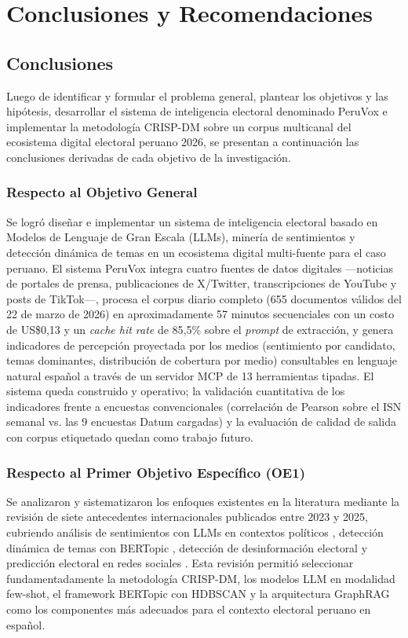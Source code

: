 \chapter{Conclusiones y Recomendaciones}
\section{Conclusiones}
Luego de identificar y formular el problema general, plantear los objetivos y las
hipótesis, desarrollar el sistema de inteligencia electoral denominado PeruVox e
implementar la metodología CRISP-DM sobre un corpus multicanal del ecosistema
digital electoral peruano 2026, se presentan a continuación las conclusiones
derivadas de cada objetivo de la investigación.
\subsection*{Respecto al Objetivo General}
Se logró diseñar e implementar un sistema de inteligencia electoral basado en
Modelos de Lenguaje de Gran Escala (LLMs), minería de sentimientos y detección
dinámica de temas en un ecosistema digital multi-fuente para el caso peruano. El
sistema PeruVox integra cuatro fuentes de datos digitales —noticias de portales
de prensa, publicaciones de X/Twitter, transcripciones de YouTube y posts de
TikTok—, procesa el corpus diario completo (655 documentos válidos del 22 de
marzo de 2026) en aproximadamente 57 minutos secuenciales con un costo de
US\$0{,}13 y un \textit{cache hit rate} de 85{,}5\% sobre el \textit{prompt} de
extracción, y genera indicadores de percepción proyectada por los medios
(sentimiento por candidato, temas dominantes, distribución de cobertura por
medio) consultables en lenguaje natural
español a través de un servidor MCP de 13 herramientas tipadas. El sistema queda
construido y operativo; la validación cuantitativa de los indicadores frente a
encuestas convencionales (correlación de Pearson sobre el ISN semanal vs. las 9
encuestas Datum cargadas) y la evaluación de calidad de salida con corpus
etiquetado quedan como trabajo futuro.
\subsection*{Respecto al Primer Objetivo Específico (OE1)}
Se analizaron y sistematizaron los enfoques existentes en la literatura mediante
la revisión de siete antecedentes internacionales publicados entre 2023 y 2025,
cubriendo análisis de sentimientos con LLMs en contextos políticos
\parencite{pr_alvarez2023llm_political, pr_gujral2024llm_elections},
detección dinámica de temas con BERTopic
\parencite{pr_mendonca2025bertopic_political, pr_janssens2025bertopic_llm,
pr_islam2025latent_topic}, detección de desinformación electoral
\parencite{pr_chen2024combating_misinformation} y predicción electoral en redes
sociales \parencite{pr_alvi2023twitter_election_review}. Esta revisión permitió
seleccionar fundamentadamente la metodología CRISP-DM, los modelos LLM en modalidad
few-shot, el framework BERTopic con HDBSCAN y la arquitectura GraphRAG como los
componentes más adecuados para el contexto electoral peruano en español.
